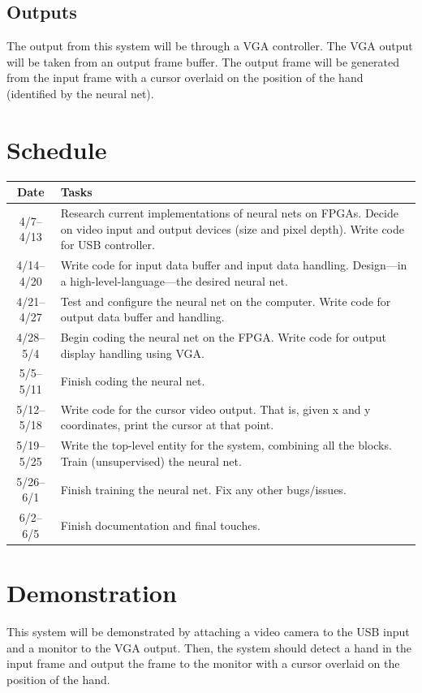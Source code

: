 \documentclass[10pt]{article}
\begin{document}
\subsection{Outputs}
\label{sub:outputs}

The output from this system will be through a VGA controller. The VGA output
will be taken from an output frame buffer. The output frame will be generated
from the input frame with a cursor overlaid on the position of the hand
(identified by the neural net).

\section{Schedule}
\label{sec:schedule}

\setlength\extrarowheight{3pt}
\begin{tabularx}{\textwidth}{c X}
    Date & Tasks \\
    \midrule
    4/7--4/13 & Research current implementations of neural nets on FPGAs. Decide
    on video input and output devices (size and pixel depth). Write code for USB
    controller. \\
    4/14--4/20 & Write code for input data buffer and input data handling.
    Design---in a high-level-language---the desired neural net. \\
    4/21--4/27 & Test and configure the neural net on the computer. Write code
    for output data buffer and handling. \\
    4/28--5/4 & Begin coding the neural net on the FPGA\@. Write code for output
    display handling using VGA\@. \\
    5/5--5/11 & Finish coding the neural net. \\
    5/12--5/18 & Write code for the cursor video output. That is, given x and y
    coordinates, print the cursor at that point. \\
    5/19--5/25 & Write the top-level entity for the system, combining all the
    blocks. Train (unsupervised) the neural net. \\
    5/26--6/1 & Finish training the neural net. Fix any other bugs/issues. \\
    6/2--6/5 & Finish documentation and final touches.
\end{tabularx}

\section{Demonstration}
\label{sec:demonstration}

This system will be demonstrated by attaching a video camera to the USB input
and a monitor to the VGA output. Then, the system should detect a hand in the
input frame and output the frame to the monitor with a cursor overlaid on the
position of the hand.
\end{document}
